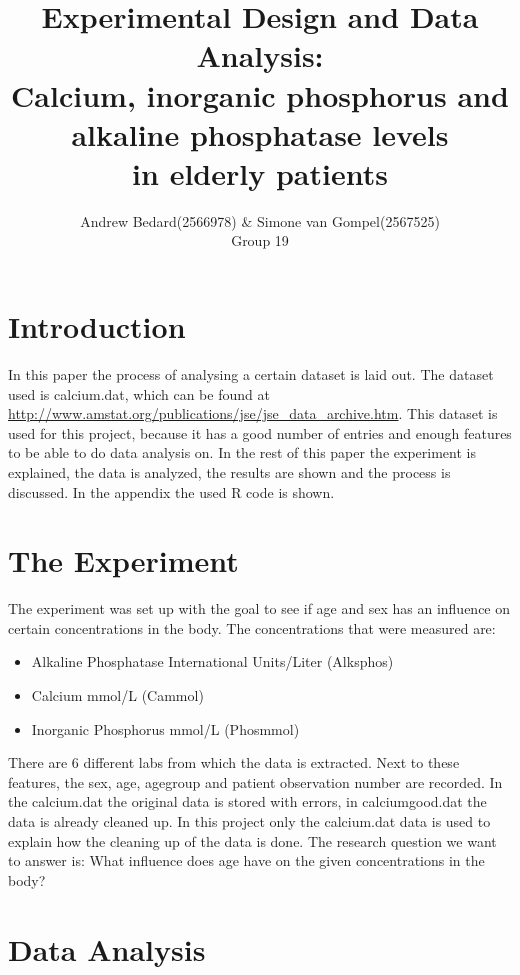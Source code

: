 \documentclass{article}
\title{Experimental Design and Data Analysis: \\ \large{Calcium, inorganic phosphorus and alkaline phosphatase levels\\ in elderly patients}}
\author{Andrew Bedard(2566978) \& Simone van Gompel(2567525) \\ Group 19}
\begin{document}
  \maketitle

  \section{Introduction}
    In this paper the process of analysing a certain dataset is laid out.
    The dataset used is calcium.dat, which can be found at \url{http://www.amstat.org/publications/jse/jse_data_archive.htm}.
    This dataset is used for this project, because it has a good number of entries and enough features to be able to do data analysis on.
    In the rest of this paper the experiment is explained, the data is analyzed, the results are shown and the process is discussed.
    In the appendix the used R code is shown.

  \section{The Experiment}
    The experiment was set up with the goal to see if age and sex has an influence on certain concentrations in the body.
    The concentrations that were measured are:
    \begin{itemize}
      \item Alkaline Phosphatase International Units/Liter (Alksphos)
      \item Calcium mmol/L (Cammol)
      \item Inorganic Phosphorus mmol/L (Phosmmol)
    \end{itemize}
    There are 6 different labs from which the data is extracted.
    Next to these features, the sex, age, agegroup and patient observation number are recorded.
    In the calcium.dat the original data is stored with errors, in calciumgood.dat the data is already cleaned up.
    In this project only the calcium.dat data is used to explain how the cleaning up of the data is done.
    The research question we want to answer is: What influence does age have on the given concentrations in the body?

  \section{Data Analysis}
\end{document}
